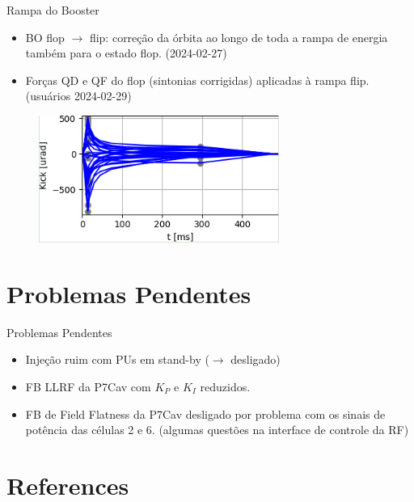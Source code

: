 \documentclass{beamer}					  %
\begin{document}
\begin{frame}{Rampa do Booster}
    \vspace{0.4 cm}
    \large{
    \begin{itemize}
            \item BO flop $\rightarrow$ flip: correção da órbita ao longo de toda a rampa de energia também para o estado flop. (2024-02-27) \vspace{0.4cm}
            \item Forças QD e QF do flop (sintonias corrigidas) aplicadas à rampa flip. (usuários 2024-02-29)
    \end{itemize}
    }
    \begin{figure}[H]
            \centering
            \includegraphics[width=0.7\textwidth]{2024-03-08/figures/boramp-kicks.png}
            \label{fig:rampbo-kicks}
    \end{figure}
\end{frame}



\section{Problemas Pendentes}

\begin{frame}{Problemas Pendentes}
    \vspace{0.4 cm}
    \large{
    \begin{itemize}
            \item Injeção ruim com PUs em stand-by ($\rightarrow$ desligado) \vspace{0.5cm}
            \item FB LLRF da P7Cav com $K_P$ e $K_I$ reduzidos. \vspace{0.5cm}
            \item FB de Field Flatness da P7Cav desligado por problema com os sinais de potência das células 2 e 6. (algumas questões na interface de controle da RF)
    \end{itemize}
    }
\end{frame}



\section{References}
\end{document}
